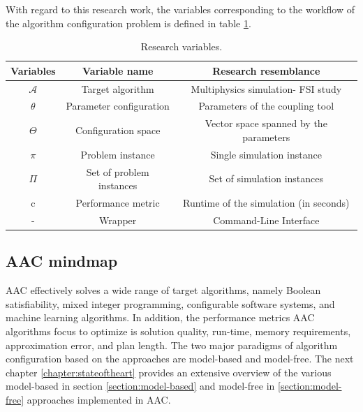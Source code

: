 With regard to this research work, the variables corresponding to the workflow of the algorithm configuration problem is defined in table \ref{Research_variables}.

\begin{table}[ht!]
\centering
\begin{tabular}{||c|c|c||} 
\hline
Variables & Variable name & Research resemblance \\ [0.5ex] 
\hline\hline
$\mathcal{A}$ & Target algorithm &Multiphysics simulation- FSI study \\ 
\hline
$\theta$ & Parameter configuration& Parameters of the coupling tool \\
\hline
$\Theta$ & Configuration space& Vector space spanned by the parameters \\
\hline
$\pi $& Problem instance & Single simulation instance \\
\hline
$\Pi $& Set of problem instances & Set of simulation instances \\
\hline
c & Performance metric & Runtime of the simulation (in seconds) \\
\hline
- &Wrapper & Command-Line Interface \\ [1ex] 
\hline
\end{tabular}
\captionsetup{justification=justified}
\caption[Research variables]{Research variables.}
\label{Research_variables}
\end{table}

\subsection{AAC mindmap}
\label{section:AACmindmap}
AAC effectively solves a wide range of target algorithms, namely Boolean satisfiability, mixed integer programming, configurable software systems, and machine learning algorithms. In addition, the performance metrics AAC algorithms focus to optimize is solution quality, run-time, memory requirements, approximation error, and plan length. The two major paradigms of algorithm configuration based on the approaches are model-based and model-free. The next chapter \ref{chapter:stateoftheart} provides an extensive overview of the various model-based in section \ref{section:model-based} and model-free in \ref{section:model-free} approaches implemented in AAC.

